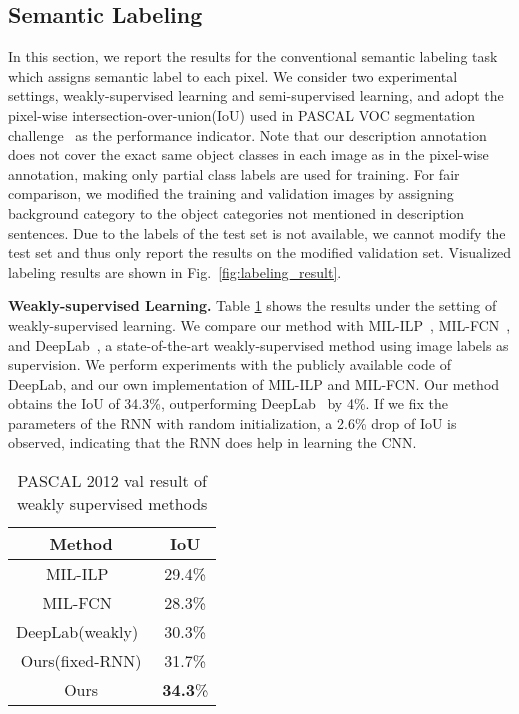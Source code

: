 \documentclass[10pt,twocolumn,letterpaper]{article}
\begin{document}
\subsection{Semantic Labeling}
\label{sub:semantic_Labeling}

In this section, we report the results for the conventional semantic labeling task which assigns semantic label to each pixel. We consider two experimental settings, \ie weakly-supervised learning and semi-supervised learning, and adopt the pixel-wise intersection-over-union(IoU) used in PASCAL VOC segmentation challenge~\cite{pascal_voc} as the performance indicator. Note that our description annotation does not cover the exact same object classes in each image as in the pixel-wise annotation, making only partial class labels are used for training. For fair comparison, we modified the training and validation images by assigning background category to the object categories not mentioned in description sentences. Due to the labels of the test set is not available, we cannot modify the test set  and thus only report the results on the modified validation set. Visualized labeling results are shown in Fig.~\ref{fig:labeling_result}.

\textbf{Weakly-supervised Learning.}
Table \ref{tbl:result_semantic_segmentation} shows the results under the setting of weakly-supervised learning. We compare our method with MIL-ILP~\cite{pinheiro2015image}, MIL-FCN~\cite{DBLP:FCnetwork}, and DeepLab~\cite{DBLP:WeaklySegmentation}, a state-of-the-art weakly-supervised method using image labels as supervision. We perform experiments with the publicly available code of DeepLab, and our own implementation of MIL-ILP and MIL-FCN. Our method obtains the IoU of 34.3\%, outperforming DeepLab~\cite{DBLP:WeaklySegmentation} by 4\%. If we fix the parameters of the RNN with random initialization, a 2.6\% drop of IoU is observed, indicating that the RNN does help in learning the CNN. %

\begin{table}[!h]\small
\begin{center}
\begin{tabular}{|c|c|}
\hline
Method & IoU \\
\hline
MIL-ILP~\cite{pinheiro2015image} & 29.4\% \\
\hline
MIL-FCN~\cite{DBLP:FCnetwork} & 28.3\% \\
\hline
DeepLab(weakly)~\cite{DBLP:WeaklySegmentation} & 30.3\% \\
\hline
Ours(fixed-RNN) & 31.7\% \\
\hline
Ours & \textbf{34.3}\% \\
\hline

\end{tabular}
\end{center}
\caption{PASCAL 2012 val result of weakly supervised methods}
\label{tbl:result_semantic_segmentation}
\end{table}
\end{document}

